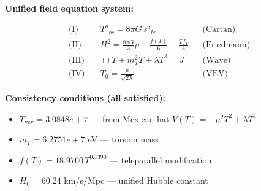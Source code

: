 
\textbf{Unified field equation system:}

\begin{align}
  \text{(I)} \quad & T^a{}_{bc} = 8\pi G \, s^a{}_{bc} && \text{(Cartan)} \\
  \text{(II)} \quad & H^2 = \frac{8\pi G}{3}\rho - \frac{f(T)}{6} + \frac{Tf_T}{3} && \text{(Friedmann)} \\
  \text{(III)} \quad & \Box T + m_T^2 T + \lambda T^3 = J && \text{(Wave)} \\
  \text{(IV)} \quad & T_0 = \frac{\mu}{\sqrt{2\lambda}} && \text{(VEV)}
\end{align}

\textbf{Consistency conditions (all satisfied):}
\begin{itemize}
  \item $T_{\text{vev}} = 3.0848e+7$ — from Mexican hat $V(T) = -\mu^2 T^2 + \lambda T^4$
  \item $m_T = 6.2751e+7$ eV — torsion mass
  \item $f(T) = 18.9760 \, T^{0.1390}$ — teleparallel modification
  \item $H_0 = 60.24$ km/s/Mpc — unified Hubble constant
\end{itemize}